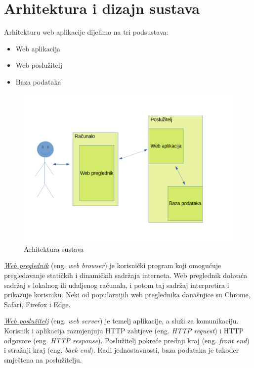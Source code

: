 \chapter{Arhitektura i dizajn sustava}

	Arhitekturu web aplikacije dijelimo na tri podsustava:
	\begin{itemize}
	\item Web aplikacija
	\item Web poslužitelj
	\item Baza podataka
	\end{itemize}

	\begin{figure}[H]
		\includegraphics[width=\textwidth]{slike/arhitektura.png}
		\centering
		\caption{Arhitektura sustava}
		\label{fig:arhitektura_sustava}
	\end{figure}
	
	\underline{\textit{Web preglednik}} (eng. \textit{web browser}) je korisnički program koji omogućuje pregledavanje statičkih i dinamičkih sadržaja interneta. Web preglednik dohvaća sadržaj s lokalnog ili udaljenog računala, i potom taj sadržaj interpretira i prikazuje korisniku. Neki od popularnijih web preglednika današnjice su Chrome, Safari, Firefox i Edge.
	
	\underline{\textit{Web poslužitelj}} (eng. \textit{web server}) je temelj aplikacije, a služi za komunikaciju. Korisnik i aplikacija razmjenjuju HTTP zahtjeve (eng. \textit{HTTP request}) i HTTP odgovore (eng. \textit{HTTP response}). Poslužitelj pokreće prednji kraj (eng. \textit{front end}) i stražnji kraj (eng. \textit{back end}). Radi jednostavnosti, baza podataka je također smještena na poslužitelju.
	
